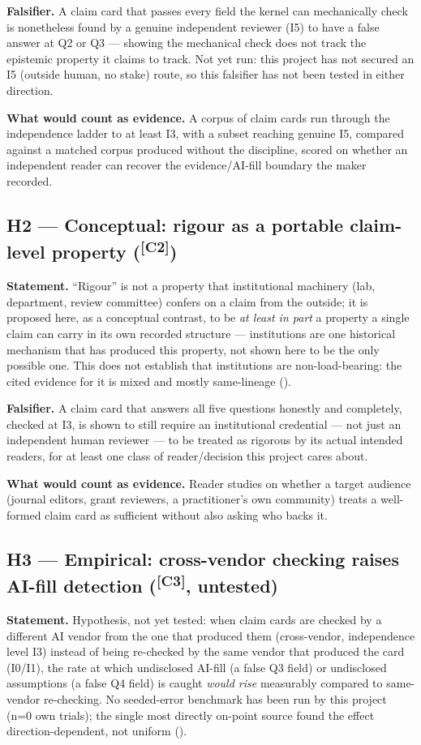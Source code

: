 \documentclass[10pt,twocolumn]{article}
\newcommand{\claimref}[1]{\textsuperscript{[#1]}}
\begin{document}
\textbf{Falsifier.} A claim card that passes every field the kernel can mechanically check is
nonetheless found by a genuine independent reviewer (I5) to have a false answer at Q2 or Q3 ---
showing the mechanical check does not track the epistemic property it claims to track. Not yet run:
this project has not secured an I5 (outside human, no stake) route, so this falsifier has not been
tested in either direction.

\textbf{What would count as evidence.} A corpus of claim cards run through the independence ladder
to at least I3, with a subset reaching genuine I5, compared against a matched corpus produced
without the discipline, scored on whether an independent reader can recover the
evidence/AI-fill boundary the maker recorded.

\subsection*{H2 --- Conceptual: rigour as a portable claim-level property (\claimref{C2})}
\textbf{Statement.} ``Rigour'' is not a property that institutional machinery (lab, department,
review committee) confers on a claim from the outside; it is proposed here, as a conceptual
contrast, to be \emph{at least in part} a property a single claim can carry in its own recorded
structure --- institutions are one historical mechanism that has produced this property, not shown
here to be the only possible one. This does not establish that institutions are non-load-bearing:
the cited evidence for it is mixed and mostly same-lineage ().

\textbf{Falsifier.} A claim card that answers all five questions honestly and completely, checked
at I3, is shown to still require an institutional credential --- not just an independent human
reviewer --- to be treated as rigorous by its actual intended readers, for at least one class of
reader/decision this project cares about.

\textbf{What would count as evidence.} Reader studies on whether a target audience (journal
editors, grant reviewers, a practitioner's own community) treats a well-formed claim card as
sufficient without also asking who backs it.

\subsection*{H3 --- Empirical: cross-vendor checking raises AI-fill detection (\claimref{C3}, untested)}
\textbf{Statement.} Hypothesis, not yet tested: when claim cards are checked by a different AI
vendor from the one that produced them (cross-vendor, independence level I3) instead of being
re-checked by the same vendor that produced the card (I0/I1), the rate at which undisclosed AI-fill
(a false Q3 field) or undisclosed assumptions (a false Q4 field) is caught \emph{would rise}
measurably compared to same-vendor re-checking. No seeded-error benchmark has been run by this
project (n=0 own trials); the single most directly on-point source found the effect
direction-dependent, not uniform ().
\end{document}
